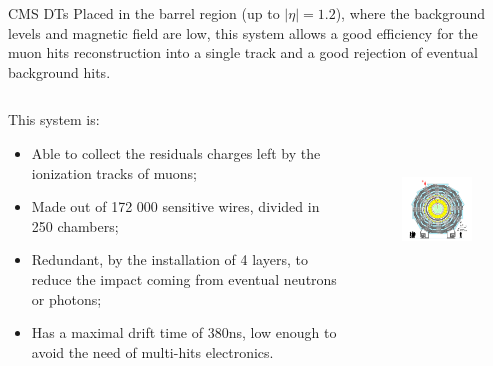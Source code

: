 \documentclass[8pt]{beamer}
\begin{document}
\begin{frame}{CMS DTs}
\justifying
\vspace{5pt}
Placed in the barrel region (up to $|\eta| = 1.2$), where the background levels and magnetic field are low, this system allows a good efficiency for the muon hits reconstruction into a single track and a good rejection of eventual background hits. \vfill

\begin{columns}
	\begin{column}{0.48 \textwidth}
	\justifying
This system is:
\begin{itemize}
\justifying
\item Able to collect the residuals charges left by the ionization tracks of muons;
\item Made out of 172 000 sensitive wires, divided in 250 chambers;
\item Redundant, by the installation of 4 layers, to reduce the impact coming from eventual neutrons or photons;
\item Has a maximal drift time of 380ns, low enough to avoid the need of multi-hits electronics.
\end{itemize}
\end{column}
	\begin{column}{0.51 \textwidth}
\begin{figure}[htbp]
\begin{center}
\includegraphics[width=6cm, height=5.2cm]{figs/CMSDT.png}
\end{center}
\end{figure}
	\end{column}
	\end{columns} \vfill
\end{frame}
\end{document}
